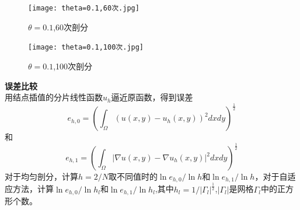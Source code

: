 \documentclass[12pt]{ctexart}
\begin{document}
\begin{figure}[H]
	\centering
	\begin{minipage}[t]{0.48\textwidth}
		\centering
		\texttt{[image: theta=0.1,60次.jpg]}
		\caption{$\theta=0.1$,60次剖分}
	\end{minipage}
	\begin{minipage}[t]{0.48\textwidth}
		\centering
		\texttt{[image: theta=0.1,100次.jpg]}
		\caption{$\theta=0.1$,100次剖分}
	\end{minipage}
\end{figure}
\noindent \textbf{误差比较}\\
用结点插值的分片线性函数$u_h$逼近原函数，得到误差
$$e_{h,0} = (\int_{\Omega}(u(x,y)-u_h(x,y))^2dxdy)^\frac{1}{2}$$
和
$$e_{h,1} = (\int_{\Omega}|\nabla u(x,y)-\nabla u_h(x,y)|^2dxdy)^\frac{1}{2}$$
对于均匀剖分，计算$h=2/N$取不同值时的$\ln e_{h,0}/\ln{h}$和$\ln e_{h,1}/\ln{h}$，对于自适应方法，计算$\ln e_{h,0}/\ln{h_l}$和$\ln e_{h,1}/\ln{h_l}$,其中$h_l=1/|\varGamma_{l}|^\frac{1}{2}$,$|\varGamma_{l}|$是网格$\varGamma_{l}$中的正方形个数。
\end{document}
